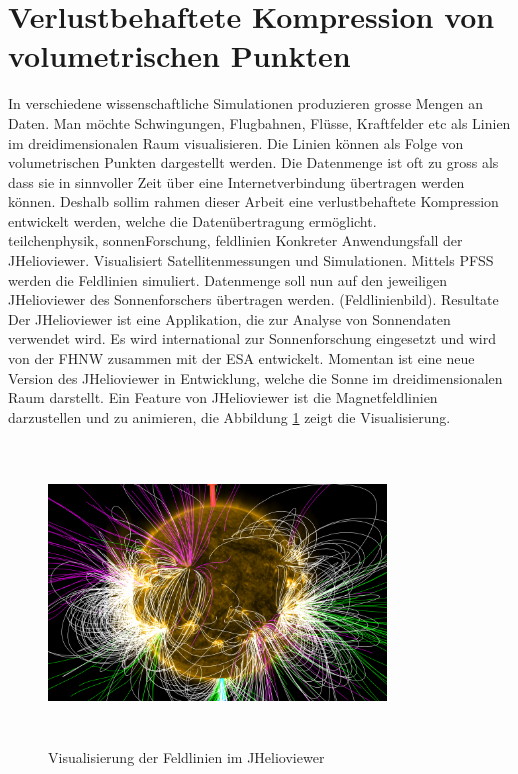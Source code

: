 \section{Verlustbehaftete Kompression von volumetrischen Punkten}
In verschiedene wissenschaftliche Simulationen produzieren grosse Mengen an Daten. Man möchte Schwingungen, Flugbahnen, Flüsse, Kraftfelder etc als Linien im dreidimensionalen Raum visualisieren. Die Linien können als Folge von volumetrischen Punkten dargestellt werden. Die Datenmenge ist oft zu gross als dass sie in sinnvoller Zeit über eine Internetverbindung übertragen werden können. Deshalb sollim rahmen dieser Arbeit eine verlustbehaftete Kompression entwickelt werden, welche die Datenübertragung ermöglicht.\\
[\baselineskip]
teilchenphysik, sonnenForschung, feldlinien Konkreter Anwendungsfall der JHelioviewer. Visualisiert Satellitenmessungen und Simulationen. Mittels PFSS werden die Feldlinien simuliert. Datenmenge soll nun auf den jeweiligen JHelioviewer des Sonnenforschers übertragen werden. (Feldlinienbild). Resultate\\
[\baselineskip]
Der JHelioviewer ist eine Applikation, die zur Analyse von Sonnendaten verwendet wird. Es wird international zur Sonnenforschung eingesetzt und wird von der FHNW zusammen mit der ESA entwickelt. Momentan ist eine neue Version des JHelioviewer in Entwicklung, welche die Sonne im dreidimensionalen Raum darstellt. Ein Feature von JHelioviewer ist die Magnetfeldlinien darzustellen und zu animieren, die Abbildung \ref{einleitung::feldlinien} zeigt die Visualisierung.
\begin{figure}[!htbp]
\center
	\includegraphics[width=0.8\textwidth,height=8cm,keepaspectratio]{./pictures/einleitung/fieldLines.png}
	\caption{Visualisierung der Feldlinien im JHelioviewer}
	\label{einleitung::feldlinien}
\end{figure}
